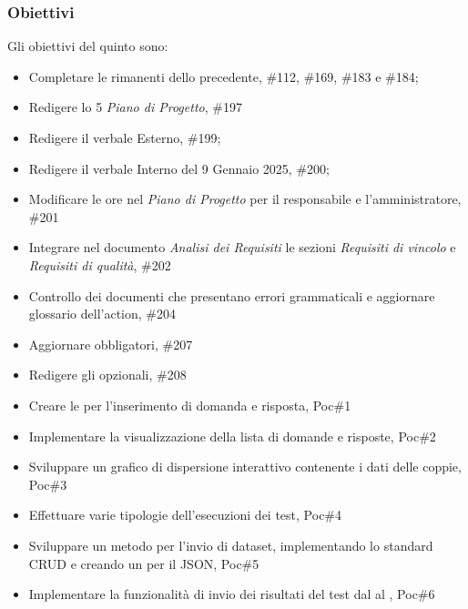 \subsubsection{Obiettivi}
Gli obiettivi del quinto  sono:
\begin{itemize}
    \item Completare le  rimanenti dello  precedente,  \#112, \#169, \#183 e \#184;
    \item Redigere lo  5 \textit{Piano di Progetto},  \#197
    \item Redigere il verbale Esterno,  \#199;
    \item Redigere il verbale Interno del 9 Gennaio 2025,  \#200;
    \item Modificare le ore nel \textit{Piano di Progetto} per il responsabile e l’amministratore,  \#201
    \item Integrare nel documento \textit{Analisi dei Requisiti} le sezioni \textit{Requisiti di vincolo} e \textit{Requisiti di qualità},  \#202
    \item Controllo dei documenti che presentano errori grammaticali e aggiornare glossario dell'action,  \#204
    \item Aggiornare  obbligatori,  \#207
    \item Redigere gli  opzionali,  \#208
    \item Creare le  per l'inserimento di domanda e risposta,  Poc\#1
    \item Implementare la visualizzazione della lista di domande e risposte,  Poc\#2
    \item Sviluppare un grafico di dispersione interattivo contenente i dati delle coppie,  Poc\#3
    \item Effettuare varie tipologie dell'esecuzioni dei test,  Poc\#4
    \item Sviluppare un metodo per l’invio di dataset, implementando lo standard CRUD e creando un  per il JSON,  Poc\#5
    \item Implementare la funzionalità di invio dei risultati del test dal  al ,  Poc\#6
\end{itemize}